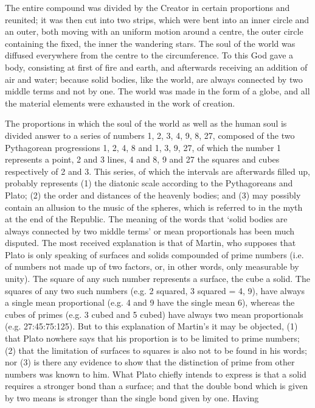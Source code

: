 The entire compound was divided by the Creator in certain proportions and
reunited; it was then cut into two strips, which were bent into an inner
circle and an outer, both moving with an uniform motion around a centre,
the outer circle containing the fixed, the inner the wandering stars. The
soul of the world was diffused everywhere from the centre to the
circumference. To this God gave a body, consisting at first of fire and
earth, and afterwards receiving an addition of air and water; because
solid bodies, like the world, are always connected by two middle terms and
not by one. The world was made in the form of a globe, and all the
material elements were exhausted in the work of creation.

The proportions in which the soul of the world as well as the human soul
is divided answer to a series of numbers 1, 2, 3, 4, 9, 8, 27, composed of
the two Pythagorean progressions 1, 2, 4, 8 and 1, 3, 9, 27, of which the
number 1 represents a point, 2 and 3 lines, 4 and 8, 9 and 27 the squares
and cubes respectively of 2 and 3. This series, of which the intervals are
afterwards filled up, probably represents (1) the diatonic scale according
to the Pythagoreans and Plato; (2) the order and distances of the heavenly
bodies; and (3) may possibly contain an allusion to the music of the
spheres, which is referred to in the myth at the end of the Republic. The
meaning of the words that ‘solid bodies are always connected by two middle
terms’ or mean proportionals has been much disputed. The most received
explanation is that of Martin, who supposes that Plato is only speaking of
surfaces and solids compounded of prime numbers (i.e. of numbers not made
up of two factors, or, in other words, only measurable by unity). The
square of any such number represents a surface, the cube a solid. The
squares of any two such numbers (e.g. 2 squared, 3 squared = 4, 9), have
always a single mean proportional (e.g. 4 and 9 have the single mean 6),
whereas the cubes of primes (e.g. 3 cubed and 5 cubed) have always two
mean proportionals (e.g. 27:45:75:125). But to this explanation of
Martin’s it may be objected, (1) that Plato nowhere says that his
proportion is to be limited to prime numbers; (2) that the limitation of
surfaces to squares is also not to be found in his words; nor (3) is there
any evidence to show that the distinction of prime from other numbers was
known to him. What Plato chiefly intends to express is that a solid
requires a stronger bond than a surface; and that the double bond which is
given by two means is stronger than the single bond given by one. Having
